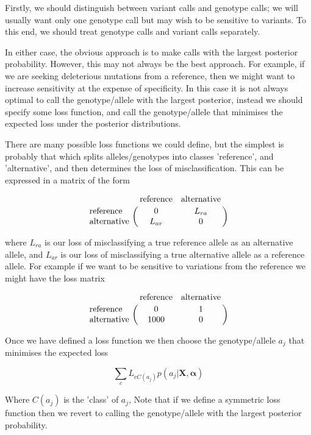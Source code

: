 \documentclass{article}
\begin{document}
Firstly, we should distinguish between variant calls and genotype calls; we will usually want only one genotype call but may wish to be sensitive to variants. To this end, we should treat genotype calls and variant calls separately.

In either case, the obvious approach is to make calls with the largest posterior probability. However, this may not always be the best approach. For example, if we are seeking deleterious mutations from a reference, then we might want to increase sensitivity at the expense of specificity. In this case it is not always optimal to call the genotype/allele with the largest posterior, instead we should specify some loss function, and call the genotype/allele that minimises the expected loss under the posterior distributions.

There are many possible loss functions we could define, but the simplest is probably that which splits alleles/genotypes into classes 'reference', and 'alternative', and then determines the loss of misclassification. This can be expressed in a matrix of the form

\begin{equation}
\bordermatrix{~ & \text{reference} & \text{alternative} \cr
              \text{reference} & 0 & L_{ra} \cr
              \text{alternative} & L_{ar} & 0 \cr}
\end{equation}

where $L_{ra}$ is our loss of misclassifying a true reference allele as an alternative allele, and $L_{ar}$ is our loss of misclassifying a true alternative allele as a reference allele. For example if we want to be sensitive to variations from the reference we might have the loss matrix

\begin{equation}
\bordermatrix{~ & \text{reference} & \text{alternative} \cr
              \text{reference} & 0 & 1 \cr
              \text{alternative} & 1000 & 0 \cr}
\end{equation}

Once we have defined a loss function we then choose the genotype/allele $a_j$ that minimises the expected loss

\begin{equation}
\sum_{c} L_{cC(a_j)}p(a_j | \boldsymbol{X}, \boldsymbol{\alpha})
\end{equation}

Where $C(a_j)$ is the 'class' of $a_j$, Note that if we define a symmetric loss function then we revert to calling the genotype/allele with the largest posterior probability.
\end{document}
